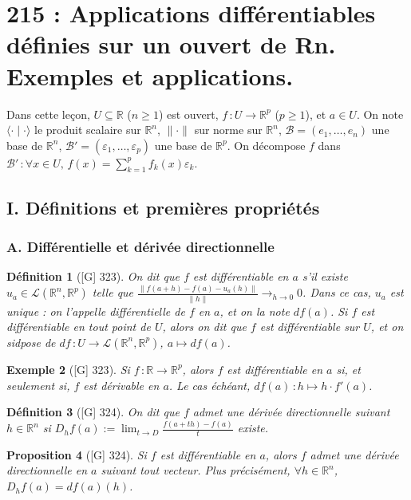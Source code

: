 \documentclass[10pt, a4paper, parskip=full, twoside, twocolumn]{report}
\newtheorem{definition}{Définition}
\newtheorem{proposition}[definition]{Proposition}
\newtheorem{example}[definition]{Exemple}
\newcommand{\IR}{\mathbb{R}}
\newcommand{\B}{\mathcal{B}}
\newcommand{\ps}[2]{\langle #1\mid #2\rangle}
\begin{document}
\chapter*{215 : Applications différentiables définies sur un ouvert de Rn. Exemples et applications.}
\setcounter{definition}{0}

\textcolor{paragraphtext}{Dans cette leçon, $U\subseteq \IR$ ($n\geq 1$) est ouvert, $f\,\colon U\to \IR^p$ ($p\geq 1$), et $a\in U$.
On note $\ps{\cdot}{\cdot}$ le produit scalaire sur $\IR^n$, $\|\cdot\|$ sur norme sur $\IR^n$, $\B=(e_1,\dots,e_n)$ une base de $\IR^n$, $\B'=(\varepsilon_1,\dots,\varepsilon_p)$ une base de $\IR^p$.
On décompose $f$ dans $\B'\,\colon \forall x\in U,\,f(x) = \sum_{k=1}^{p} f_k(x)\varepsilon_k$.}

\section*{I. Définitions et premières propriétés}
\subsection*{A. Différentielle et dérivée directionnelle}

\begin{definition}[\textnormal{[G] 323}]
	On dit que $f$ est \emph{différentiable en $a$} s'il existe $u_a\in\mathcal{L}(\IR^n,\IR^p)$ telle que $\frac{\|f(a+h)-f(a)-u_a(h)\|}{\|h\|}\longrightarrow_{h\to 0}0$.
	Dans ce cas, $u_a$ est unique : on l'appelle \emph{différentielle de $f$ en $a$}, et on la note $df(a)$.
	Si $f$ est différentiable en tout point de $U$, alors on dit que $f$ est \emph{différentiable sur $U$}, et on sidpose de $df\,\colon U\to \mathcal{L}(\IR^n,\IR^p)$, $a\mapsto df(a)$.
\end{definition}

\begin{example}[\textnormal{[G] 323}]
	Si $f\,\colon \IR\to\IR^p$, alors $f$ est différentiable en $a$ si, et seulement si, $f$ est dérivable en $a$.
	Le cas échéant, $df(a)\,\colon h\mapsto h\cdot f'(a)$.
\end{example}

\begin{definition}[\textnormal{[G] 324}]
	On dit que $f$ admet une \emph{dérivée directionnelle suivant $h\in\IR^n$} si $D_hf(a) := \lim_{t\to D} \frac{f(a+th) - f(a)}{t}$ existe.
\end{definition}

\begin{proposition}[\textnormal{[G] 324}]
	Si $f$ est différentiable en $a$, alors $f$ admet une dérivée directionnelle en $a$ suivant tout vecteur. Plus précisément, $\forall h\in \IR^n$, $D_hf(a)=df(a)(h)$.
\end{proposition}
\end{document}
